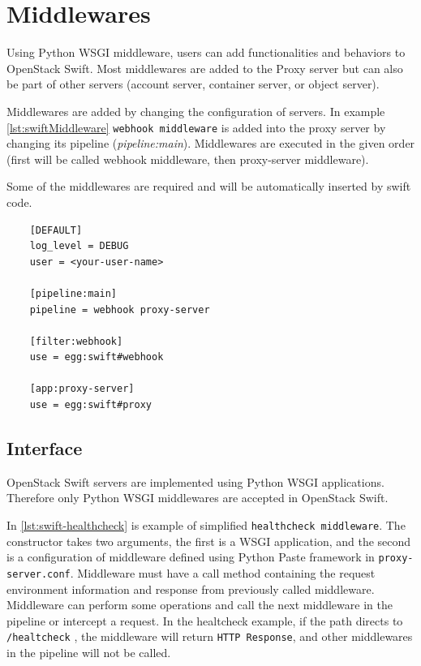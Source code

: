    \section{Middlewares}
    Using Python WSGI middleware, users can add functionalities and behaviors to OpenStack Swift. Most middlewares are added to the Proxy server but can also be part of other servers (account server, container server, or object server).

    Middlewares are added by changing the configuration of servers. In example \ref{lst:swiftMiddleware}
    \texttt{webhook middleware} is added into the proxy server by changing its pipeline (\textit{pipeline:main}). Middlewares are executed in the given order (first will be called webhook middleware, then proxy-server middleware).

    Some of the middlewares are required and will be automatically inserted by swift code\cite{swiftMiddleware}.

    \lstset{
        caption=Example of proxy server configuration (proxy-server.conf).,
        label=lst:swiftMiddleware
    }
    \begin{lstlisting}
    [DEFAULT]
    log_level = DEBUG
    user = <your-user-name>

    [pipeline:main]
    pipeline = webhook proxy-server

    [filter:webhook]
    use = egg:swift#webhook

    [app:proxy-server]
    use = egg:swift#proxy
    \end{lstlisting}

    \subsection{Interface}
    OpenStack Swift servers are implemented using Python WSGI applications. Therefore only Python WSGI middlewares are accepted in OpenStack Swift.

    In \ref{lst:swift-healthcheck} is example of simplified \texttt{healthcheck middleware}. The constructor takes two arguments, the first is a WSGI application, and the second is a configuration of middleware defined using Python Paste framework in \texttt{proxy-server.conf}. Middleware must have a call method containing the request environment information and response from previously called middleware. Middleware can perform some operations and call the next middleware in the pipeline or intercept a request. In the healtcheck example, if the path directs to \texttt{/healtcheck} , the middleware will return \texttt{HTTP Response}, and other middlewares in the pipeline will not be called.

